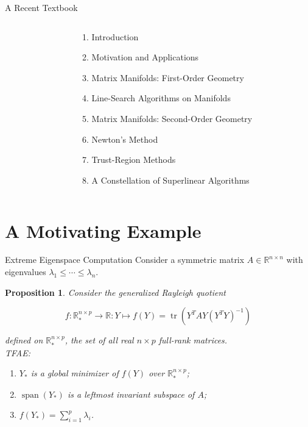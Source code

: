 \documentclass[xcolor=dvipsnames,t]{beamer} %
\newcommand{\reals}{\mathbb{R}}
\newtheorem*{proposition*}{Proposition}
\begin{document}
\begin{frame}{A Recent Textbook}
\begin{columns}
\begin{column}{0.4\textwidth}
      \end{column}
      \begin{column}{0.6\textwidth}
         {\footnotesize
         \begin{enumerate}[1.]
            \item Introduction
            \item Motivation and Applications
            \item Matrix Manifolds: First-Order Geometry
            \item Line-Search Algorithms on Manifolds
            \item Matrix Manifolds: Second-Order Geometry
            \item Newton's Method
            \item Trust-Region Methods
            \item A Constellation of Superlinear Algorithms
         \end{enumerate}
         }
      \end{column}
   \end{columns}
\end{frame}


\section{A Motivating Example}
\begin{frame}{Extreme Eigenspace Computation}
   Consider a symmetric matrix $A\in\reals^{n\times n}$ with eigenvalues $\lambda_1\le \cdots \le \lambda_n$.

   \begin{proposition*}
      Consider the \emph{generalized Rayleigh quotient}
      
      \[ f:\reals^{n\times p}_\ast \to \reals : Y \mapsto f(Y) = \operatorname{tr}(Y^TAY(Y^TY)^{-1}) \] 

      \noindent defined on $\reals^{n\times p}_\ast$, the set of all real $n\times p$ full-rank matrices.\\

      TFAE:
      \begin{enumerate}[1.]
         \item $Y_\ast$ is a global minimizer of $f(Y)$ over $\reals^{n\times p}_\ast$;
         \item $\operatorname{span}(Y_\ast)$ is a leftmost invariant subspace of $A$;
         \item $f(Y_\ast) = \sum_{i=1}^p \lambda_i$.
      \end{enumerate}
   \end{proposition*}

\end{frame}
\end{document}
